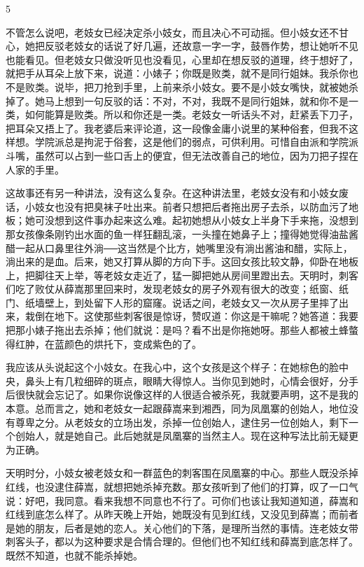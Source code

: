 5 

不管怎么说吧，老妓女已经决定杀小妓女，而且决心不可动摇。但小妓女还不甘心，她把反驳老妓女的话说了好几遍，还故意一字一字，鼓唇作势，想让她听不见也能看见。但老妓女只做没听见也没看见，心里却在想反驳的道理，终于想好了，就把手从耳朵上放下来，说道：小婊子；你既是败类，就不是同行姐妹。我杀你也不是败类。说毕，把刀抢到手里，上前来杀小妓女。要不是小妓女嘴快，就被她杀掉了。她马上想到一句反驳的话：不对，不对，我既不是同行姐妹，就和你不是一类，如何能算是败类。所以和你还是一类。老妓女一听话头不对，赶紧丢下刀子，把耳朵又捂上了。我老婆后来评论道，这一段像金庸小说里的某种俗套，但我不这样想。学院派总是拘泥于俗套，这是他们的弱点，可供利用。可惜自由派和学院派斗嘴，虽然可以占到一些口舌上的便宜，但无法改善自己的地位，因为刀把子捏在人家的手里。 

这故事还有另一种讲法，没有这么复杂。在这种讲法里，老妓女没有和小妓女废话，小妓女也没有把臭袜子吐出来。前者只想把后者拖出房子去杀，以防血污了地板；她可没想到这件事办起来这么难。起初她想从小妓女上半身下手来拖，没想到那女孩像条刚钓出水面的鱼一样狂翻乱滚，一头撞在她鼻子上；撞得她觉得油盐酱醋一起从口鼻里往外淌──这当然是个比方，她嘴里没有淌出酱油和醋，实际上，淌出来的是血。后来，她又打算从脚的方向下手。这回女孩比较文静，仰卧在地板上，把脚往天上举，等老妓女走近了，猛一脚把她从房间里蹬出去。天明时，刺客们吃了败仗从薛嵩那里回来时，发现老妓女的房子外观有很大的改变；纸窗、纸门、纸墙壁上，到处留下人形的窟窿。说话之间，老妓女又一次从房子里摔了出来，栽倒在地下。这使那些刺客很是惊讶，赞叹道：你这是干嘛呢？她答道：我要把那小婊子拖出去杀掉；他们就说：是吗？看不出是你拖她呀。那些人都被土蜂螫得红肿，在蓝颜色的烘托下，变成紫色的了。 

我应该从头说起这个小妓女。在我心中，这个女孩是这个样子：在她棕色的脸中央，鼻头上有几粒细碎的斑点，眼睛大得惊人。当你见到她时，心情会很好，分手后很快就会忘记了。如果你说像这样的人很适合被杀死，我就要声明，这不是我的本意。总而言之，她和老妓女一起跟薛嵩来到湘西，同为凤凰寨的创始人，地位没有尊卑之分。从老妓女的立场出发，杀掉一位创始人，逮住另一位创始人，剩下一个创始人，就是她自己。此后她就是凤凰寨的当然主人。现在这种写法比前无疑更为正确。 

天明时分，小妓女被老妓女和一群蓝色的刺客围在凤凰寨的中心。那些人既没杀掉红线，也没逮住薛嵩，就想把她杀掉充数。那女孩听到了他们的打算，叹了一口气说：好吧，我同意。看来我想不同意也不行了。可你们也该让我知道知道，薛嵩和红线到底怎么样了。从昨天晚上开始，她既没有见到红线，又没见到薛嵩；而前者是她的朋友，后者是她的恋人。关心他们的下落，是理所当然的事情。连老妓女带刺客头子，都以为这种要求是合情合理的。但他们也不知红线和薛嵩到底怎样了。既然不知道，也就不能杀掉她。 

